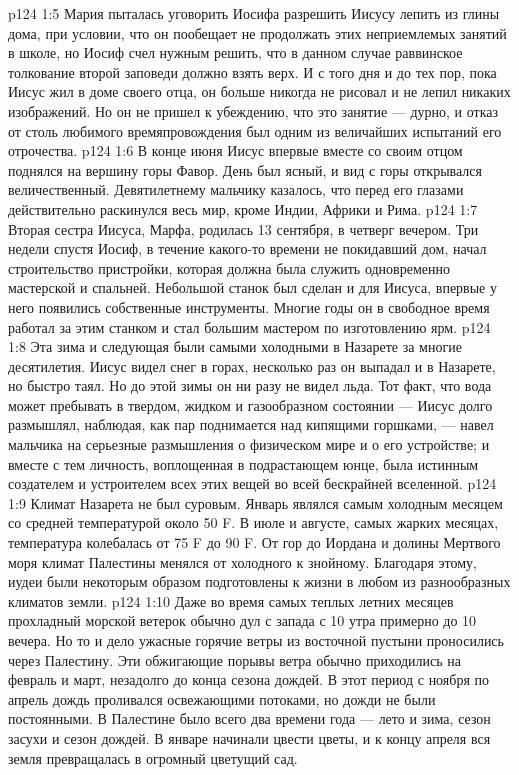 \vs p124 1:5 Мария пыталась уговорить Иосифа разрешить Иисусу лепить из глины дома, при условии, что он пообещает не продолжать этих неприемлемых занятий в школе, но Иосиф счел нужным решить, что в данном случае раввинское толкование второй заповеди должно взять верх. И с того дня и до тех пор, пока Иисус жил в доме своего отца, он больше никогда не рисовал и не лепил никаких изображений. Но он не пришел к убеждению, что это занятие --- дурно, и отказ от столь любимого времяпровождения был одним из величайших испытаний его отрочества.
\vs p124 1:6 \pc В конце июня Иисус впервые вместе со своим отцом поднялся на вершину горы Фавор. День был ясный, и вид с горы открывался величественный. Девятилетнему мальчику казалось, что перед его глазами действительно раскинулся весь мир, кроме Индии, Африки и Рима.
\vs p124 1:7 \pc Вторая сестра Иисуса, Марфа, родилась 13 сентября, в четверг вечером. Три недели спустя Иосиф, в течение какого\hyp{}то времени не покидавший дом, начал строительство пристройки, которая должна была служить одновременно мастерской и спальней. Небольшой станок был сделан и для Иисуса, впервые у него появились собственные инструменты. Многие годы он в свободное время работал за этим станком и стал большим мастером по изготовлению ярм.
\vs p124 1:8 \pc Эта зима и следующая были самыми холодными в Назарете за многие десятилетия. Иисус видел снег в горах, несколько раз он выпадал и в Назарете, но быстро таял. Но до этой зимы он ни разу не видел льда. Тот факт, что вода может пребывать в твердом, жидком и газообразном состоянии --- Иисус долго размышлял, наблюдая, как пар поднимается над кипящими горшками, --- навел мальчика на серьезные размышления о физическом мире и о его устройстве; и вместе с тем личность, воплощенная в подрастающем юнце, была истинным создателем и устроителем всех этих вещей во всей бескрайней вселенной.
\vs p124 1:9 Климат Назарета не был суровым. Январь являлся самым холодным месяцем со средней температурой около 50 F. В июле и августе, самых жарких месяцах, температура колебалась от 75 F до 90 F. От гор до Иордана и долины Мертвого моря климат Палестины менялся от холодного к знойному. Благодаря этому, иудеи были некоторым образом подготовлены к жизни в любом из разнообразных климатов земли.
\vs p124 1:10 Даже во время самых теплых летних месяцев прохладный морской ветерок обычно дул с запада с 10 утра примерно до 10 вечера. Но то и дело ужасные горячие ветры из восточной пустыни проносились через Палестину. Эти обжигающие порывы ветра обычно приходились на февраль и март, незадолго до конца сезона дождей. В этот период с ноября по апрель дождь проливался освежающими потоками, но дожди не были постоянными. В Палестине было всего два времени года --- лето и зима, сезон засухи и сезон дождей. В январе начинали цвести цветы, и к концу апреля вся земля превращалась в огромный цветущий сад.
